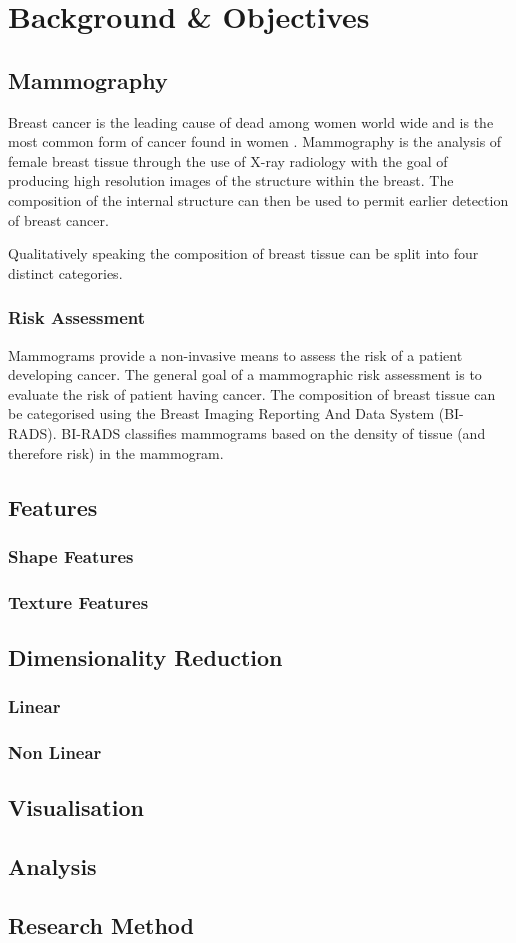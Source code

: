 \chapter{Background \& Objectives}

\section{Mammography}
Breast cancer is the leading cause of dead among women world wide and is the most common form of cancer found in women \cite{siegel2014cancer}. Mammography is the analysis of female breast tissue through the use of X-ray radiology with the goal of producing high resolution images of the structure within the breast. The composition of the internal structure can then be used to permit earlier detection of breast cancer.

Qualitatively speaking the composition of breast tissue can be split into four distinct categories.
\subsection{Risk Assessment}
Mammograms provide a non-invasive means to assess the risk of a patient developing cancer. The general goal of a mammographic risk assessment is to evaluate the risk of patient having cancer. The composition of breast tissue can be categorised using the Breast Imaging Reporting And Data System (BI-RADS)\cite{american1998breast}. BI-RADS classifies mammograms based on the density of tissue (and therefore risk) in the mammogram.

\section{Features}
\subsection{Shape Features}
\subsection{Texture Features}

\section{Dimensionality Reduction}
\subsection{Linear}
\subsection{Non Linear}

\section{Visualisation}

\section{Analysis}

\section{Research Method}
